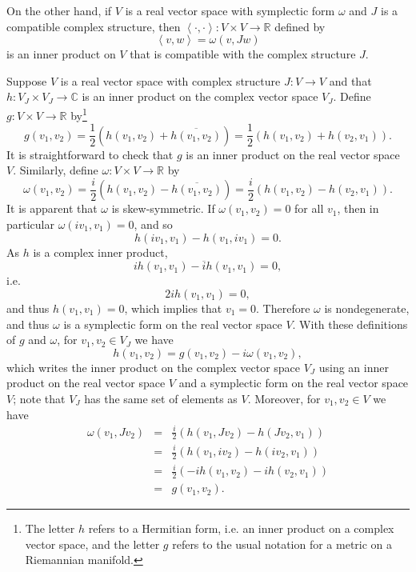 \documentclass{article}
\newcommand{\inner}[2]{\left\langle #1, #2 \right\rangle}
\begin{document}
On the other hand,
if $V$ is a real vector space with symplectic form $\omega$ and $J$ is a compatible complex structure,
then $\inner{\cdot}{\cdot}: V \times V \to \mathbb{R}$ defined by
\[
\inner{v}{w}=\omega(v,Jw)
\]
is an inner product on $V$ that is compatible with the complex structure $J$. 

Suppose $V$ is a real vector space with complex structure $J:V \to V$ and that $h:V_J \times V_J \to \mathbb{C}$ 
is an inner product on the complex vector space $V_J$. Define $g:V \times V \to \mathbb{R}$ by\footnote{The
letter $h$ refers to a Hermitian form, i.e. an inner product on a complex vector space, and the letter $g$ refers
to the usual notation for a metric on a Riemannian manifold.}
\[
g(v_1,v_2)=\frac{1}{2}\left(h(v_1,v_2)+\overline{h(v_1,v_2)}\right)=
\frac{1}{2}\left(h(v_1,v_2)+h(v_2,v_1)\right).
\]
It is straightforward to check that $g$ is an inner product on the real vector space $V$. 
Similarly, define $\omega:V \times V \to \mathbb{R}$ by
\[
\omega(v_1,v_2)=\frac{i}{2}\left(h(v_1,v_2)-\overline{h(v_1,v_2)}\right)=\frac{i}{2}\left(h(v_1,v_2)-h(v_2,v_1)\right).
\]
It is apparent that $\omega$ is skew-symmetric. If $\omega(v_1,v_2)=0$ for all $v_1$, then in particular
$\omega(iv_1,v_1)=0$, and so
\[
h(iv_1,v_1)-h(v_1,iv_1)=0.
\]
As $h$ is a complex inner product,
\[
ih(v_1,v_1)-\overline{i}h(v_1,v_1)=0,
\]
i.e.
\[
2ih(v_1,v_1)=0,
\]
and thus $h(v_1,v_1)=0$, which implies that $v_1=0$. Therefore $\omega$ is nondegenerate, and thus
$\omega$ is a symplectic form on the real vector space $V$. 
With these definitions of $g$ and $\omega$, for $v_1,v_2 \in V_J$ we have
\[
h(v_1,v_2)=g(v_1,v_2)-i\omega(v_1,v_2),
\]
which writes the inner product on the complex vector space $V_J$ using an inner product on the real
vector space $V$ and a symplectic form on the real vector space $V$;
note that $V_J$ has the same set of elements as $V$. 
Moreover, for $v_1,v_2 \in V$ we have
\begin{eqnarray*}
\omega(v_1,Jv_2)&=&\frac{i}{2}\left(h(v_1,Jv_2)-h(Jv_2,v_1)\right)\\
&=&\frac{i}{2}\left(h(v_1,iv_2)-h(iv_2,v_1)\right)\\
&=&\frac{i}{2}\left(-ih(v_1,v_2)-ih(v_2,v_1)\right)\\
&=&g(v_1,v_2).
\end{eqnarray*}
\end{document}
